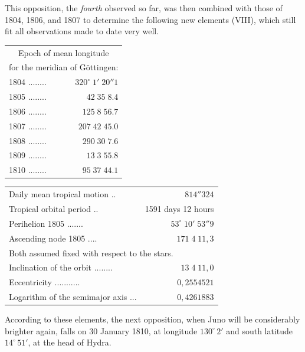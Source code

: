 \par\indent This opposition, the \emph{fourth} observed so far, was then combined with those of 1804, 1806, and 1807 to determine the following new elements (VIII), which still fit all observations made to date very well.


\begin{center}\fontsize{10}{12}\selectfont\setlength{\tabcolsep}{3pt}\renewcommand{\arraystretch}{1.15}\begin{tabular}{lr}
\multicolumn{2}{c}{Epoch of mean longitude}\\
\multicolumn{2}{c}{for the meridian of Göttingen:}\\\hline
1804 .\;.\;.\;.\;.\;.\;.\;.\; & $320^\circ\;1'\;20''1$\\
1805 .\;.\;.\;.\;.\;.\;.\;.\; & $42\;35\;8.4$\\
1806 .\;.\;.\;.\;.\;.\;.\;.\; & $125\;8\;56.7$\\
1807 .\;.\;.\;.\;.\;.\;.\;.\; & $207\;42\;45.0$\\
1808 .\;.\;.\;.\;.\;.\;.\;.\; & $290\;30\;7.6$\\
1809 .\;.\;.\;.\;.\;.\;.\;.\; & $13\;3\;55.8$\\
1810 .\;.\;.\;.\;.\;.\;.\;.\; & $95\;37\;44.1$\\
\end{tabular}\end{center}

\begin{center}\fontsize{9}{11}\selectfont\setlength{\tabcolsep}{3pt}\renewcommand{\arraystretch}{1.15}\begin{tabular}{lr}
Daily mean tropical motion .\;.\; & $814''324$\\
Tropical orbital period .\;.\; & 1591 days 12 hours\\
Perihelion 1805 .\;.\;.\;.\;.\;.\;.\; & $53^\circ\;10'\;53''9$\\
Ascending node 1805 .\;.\;.\;.\; & $171\;4\;11{,}3$\\
\multicolumn{2}{l}{\quad Both assumed fixed with respect to the stars.}\\
Inclination of the orbit .\;.\;.\;.\;.\;.\;.\;.\; & $13\;4\;11{,}0$\\
Eccentricity .\;.\;.\;.\;.\;.\;.\;.\;.\;.\;.\; & $0{,}2554521$\\
Logarithm of the semimajor axis .\;.\;.\; & $0{,}4261883$\\
\end{tabular}\end{center}


\par\indent According to these elements, the next opposition, when Juno will be considerably brighter again, falls on 30 January 1810, at longitude $130^\circ\,2'$ and south latitude $14^\circ\,51'$, at the head of Hydra.

